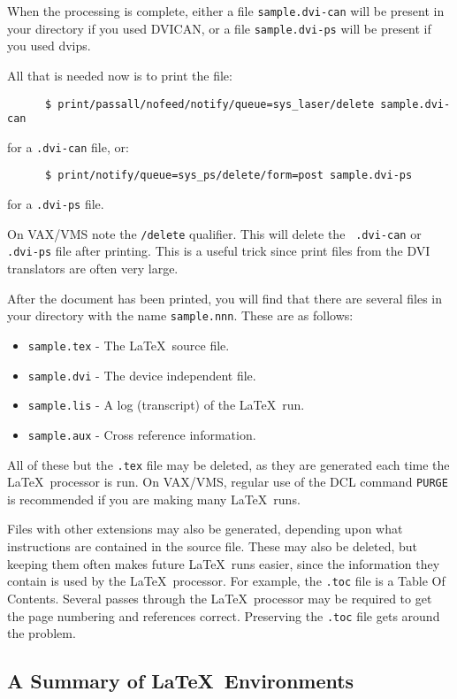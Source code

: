 When the processing is complete, either a file \mbox{\tt sample.dvi-can} will 
be present in your directory if you used DVICAN, or a file 
\mbox{\tt sample.dvi-ps} will be present if you used dvips.

All that is needed now is to print the file:
\begin{verbatim}
      $ print/passall/nofeed/notify/queue=sys_laser/delete sample.dvi-can
\end{verbatim}
for a \mbox{\tt .dvi-can} file, or:
\begin{verbatim}
      $ print/notify/queue=sys_ps/delete/form=post sample.dvi-ps
\end{verbatim}
for a \mbox{\tt .dvi-ps} file.

On VAX/VMS note the {\tt /delete} qualifier. This will delete the \mbox{\tt
.dvi-can} or  \mbox{\tt .dvi-ps} file after printing. This is a useful  trick
since print files from the DVI translators are often very large.

After the document has been printed, you will find that there are several files
in your directory with the name \mbox{\tt sample.nnn}. These are as follows:
\begin{itemize}
\item {\tt sample.tex} - The \LaTeX\ source file.
\item {\tt sample.dvi} - The device independent file.
\item {\tt sample.lis} - A log (transcript) of the \LaTeX\ run.
\item {\tt sample.aux} - Cross reference information.
\end{itemize}
All of these but the \mbox{\tt .tex} file may be deleted, as they are generated 
each time the \LaTeX\ processor is run. On VAX/VMS, regular use of the DCL
command \mbox{\tt PURGE} is recommended if you are making many \LaTeX\ runs.

Files with other extensions may also be generated, depending upon what
instructions are contained in the source file. These may also be deleted, but 
keeping them often makes future \LaTeX\ runs easier, since the information they
contain is used by the \LaTeX\ processor. For example, the \mbox{\tt .toc} 
file is a Table Of Contents. Several passes through the \LaTeX\ processor may 
be required to get the page numbering and references correct. Preserving the 
{\tt .toc} file gets around the problem.

\subsection{A Summary of \LaTeX\ Environments}
\label{se:environments}

